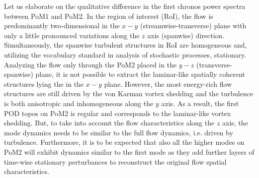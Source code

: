 {{Let us elaborate on the} qualitative difference in the first chronos power spectra between PoM1 and PoM2. In the region of interest (RoI), the flow  is predominantly two-dimensional in the $x-y$ {(streamwise-transverse)} plane with only a little pronounced variations along the $z$ axis {(spanwise)} direction. {Simultaneously, the spanwise turbulent structures in RoI are homogeneous and, utilizing the vocabulary standard in analysis of stochastic processes, stationary. Analyzing the flow only through the PoM2 placed in the $y-z$ (transverse-spanwise) plane, it is not possible to extract the laminar-like spatially coherent structures lying the in the $x-y$ plane. However, the most energy-rich flow structures are still driven by the von Karman vortex shedding and the turbulence is both anisotropic and inhomogeneous along the $y$ axis. As a result, the first POD topos on PoM2 is regular and corresponds to the laminar-like vortex shedding. But, to take into account the flow characteristics along the $z$ axis, the mode dynamics needs to be similar to the full flow dynamics, i.e. driven by turbulence. Furthermore, it is to be expected that also all the higher modes on PoM2 will exhibit dynamics similar to the first mode as they add further layers of time-wise stationary perturbances to reconstruct the original flow spatial characteristics.}







}
